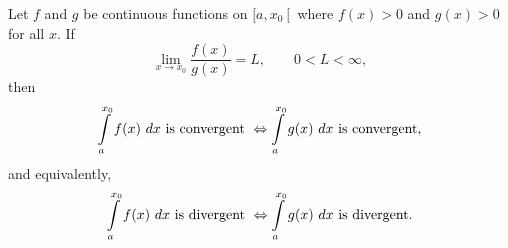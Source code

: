 \pagebreak
\begin{theorem}\label{thm:impint_limit2}

		Let $f$ and $g$ be continuous functions on $[a,{x_0}\left[\right.$ where $f(x)>0$ and $g(x)>0$ for all $x$. If $$\lim_{x\to x_0} \frac{f(x)}{g(x)} = L,\qquad 0<L<\infty,$$
	then 
	$$\displaystyle \int\limits_a^{x_0} f(x)\ dx \text{ is convergent }\Leftrightarrow  \displaystyle \int\limits_a^{x_0} g(x)\ dx \text{ is convergent,} $$ 
	and equivalently,
	$$\displaystyle \int\limits_a^{x_0} f(x)\ dx \text{ is divergent }\Leftrightarrow  \displaystyle \int\limits_a^{x_0} g(x)\ dx \text{ is divergent.} $$ 
\end{theorem}

\fi



